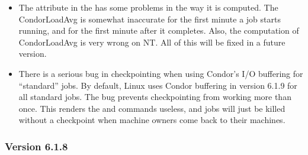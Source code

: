 \begin{itemize}

\item The  attribute in the  has
some problems in the way it is computed.
The CondorLoadAvg is somewhat inaccurate for the first minute a job
starts running, and for the first minute after it completes.
Also, the computation of CondorLoadAvg is very wrong on NT.
All of this will be fixed in a future version.

\item There is a serious bug in checkpointing when using Condor's
I/O buffering for ``standard'' jobs.
By default, Linux uses Condor buffering in version 6.1.9 for all
standard jobs.
The bug prevents checkpointing from working more than once.
This renders the  and  commands
useless, and jobs will just be killed without a checkpoint when
machine owners come back to their machines.

\end{itemize}


\subsubsection{\label{sec:New-6-1-8}Version 6.1.8}

